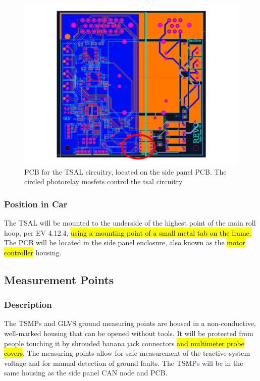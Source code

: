 \documentclass{article}
\DeclareRobustCommand{\hlr}[1]{{\sethlcolor{red}\hl{#1}}}
\begin{document}
            \begin{figure}[H]
                \centering
                \includegraphics[width = 0.7 \textwidth]{TSALspacing}
                \caption{PCB for the TSAL circuitry, located on the side panel PCB. The circled photorelay mosfets control the tsal circuitry}
                \label{sidepanelpcb}
            \end{figure}

        \subsubsection{Position in Car}

            The TSAL will be mounted to the underside of the highest point of the main roll hoop, per EV 4.12.4, \hlr{using a mounting point of a small metal tab on the frame. }The PCB will be located in the side panel enclosure, also known as the \hlr{motor controller} housing.

    \subsection{Measurement Points}

        \subsubsection{Description}


            The TSMPs and GLVS ground measuring points are housed in a non-conductive, well-marked housing that can be opened without tools. It will be protected from people touching it by shrouded banana jack connectors \hlr{and multimeter probe covers}. The measuring points allow for safe measurement of the tractive system voltage and for manual detection of ground faults. The TSMPs will be in the same housing as the side panel CAN node and PCB.
\end{document}
